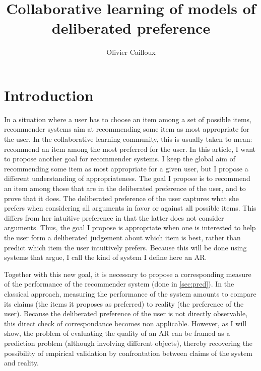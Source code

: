 \documentclass[french, english]{da2pl2018}
\begin{document}
\title{%
	Collaborative learning of models of deliberated preference%
}
\author{Olivier Cailloux}
\makeatletter
\makeatother
\maketitle

\section{Introduction}
In a situation where a user has to choose an item among a set of possible items, recommender systems aim at recommending some item as most appropriate for the user.
In the collaborative learning community, this is usually taken to mean: recommend an item among the most preferred for the user. In this article, I want to propose another goal for recommender systems. I keep the global aim of recommending some item as most appropriate for a given user, but I propose a different understanding of appropriateness. The goal I propose is to recommend an item among those that are in the deliberated preference of the user, and to prove that it does. The deliberated preference of the user captures what she prefers when considering all arguments in favor or against all possible items. This differs from her intuitive preference in that the latter does not consider arguments. Thus, the goal I propose is appropriate when one is interested to help the user form a deliberated judgement about which item is best, rather than predict which item the user intuitively prefers. Because this will be done using systems that argue, I call the kind of system I define here an \ac{AR}.

Together with this new goal, it is necessary to propose a corresponding measure of the performance of the recommender system (done in \cref{sec:pred}). In the classical approach, measuring the performance of the system amounts to compare its claims (the items it proposes as preferred) to reality (the preference of the user). Because the deliberated preference of the user is not directly observable, this direct check of correspondance becomes non applicable. However, as I will show, the problem of evaluating the quality of an \ac{AR} can be framed as a prediction problem (although involving different objects), thereby recovering the possibility of empirical validation by confrontation between claims of the system and reality.
\end{document}

